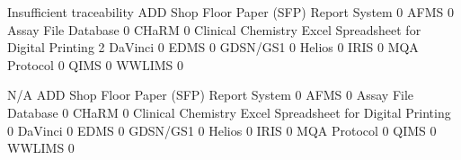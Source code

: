 \documentclass{article}
\begin{document}
\begin{Schunk}
\begin{Soutput}
                                                            Insufficient traceability
  ADD Shop Floor Paper (SFP) Report System                                          0
  AFMS                                                                              0
  Assay File Database                                                               0
  CHaRM                                                                             0
  Clinical Chemistry Excel Spreadsheet for Digital Printing                         2
  DaVinci                                                                           0
  EDMS                                                                              0
  GDSN/GS1                                                                          0
  Helios                                                                            0
  IRIS                                                                              0
  MQA Protocol                                                                      0
  QIMS                                                                              0
  WWLIMS                                                                            0
                                                           
                                                            N/A
  ADD Shop Floor Paper (SFP) Report System                    0
  AFMS                                                        0
  Assay File Database                                         0
  CHaRM                                                       0
  Clinical Chemistry Excel Spreadsheet for Digital Printing   0
  DaVinci                                                     0
  EDMS                                                        0
  GDSN/GS1                                                    0
  Helios                                                      0
  IRIS                                                        0
  MQA Protocol                                                0
  QIMS                                                        0
  WWLIMS                                                      0
                                                           

\end{Soutput}
\end{Schunk}
\end{document}
